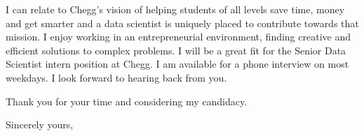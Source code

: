 \documentclass{letter} %
\begin{document}
\begin{letter}
\noindent %
I can relate to Chegg's vision of helping students of all levels save time, money and get smarter and a data scientist is uniquely placed to contribute towards that mission. I enjoy working in an entrepreneurial environment, finding creative and efficient solutions to complex problems. I will be a great fit for the Senior Data Scientist intern position at Chegg. I am available for a phone interview on most weekdays. I look forward to hearing back from you.

Thank you for your time and considering my candidacy. 
 
\closing{Sincerely yours,} 
 

 

\end{letter}
\end{document}
